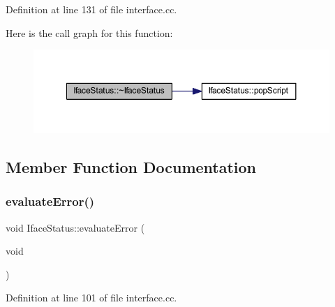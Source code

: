 Definition at line 131 of file interface.\+cc.

Here is the call graph for this function\+:
\nopagebreak
\begin{figure}[H]
\begin{center}
\leavevmode
\includegraphics[width=350pt]{class_iface_status_a152d9671686caf590fd91af5eb6e5b9a_cgraph}
\end{center}
\end{figure}


\subsection{Member Function Documentation}
\mbox{\label{class_iface_status_a07467671ab32029fffb11bad9f7c634e}} 
\subsubsection{\texorpdfstring{evaluateError()}{evaluateError()}}
{\footnotesize\ttfamily void Iface\+Status\+::evaluate\+Error (\begin{DoxyParamCaption}\item[{void}]{ }\end{DoxyParamCaption})}



Definition at line 101 of file interface.\+cc.

